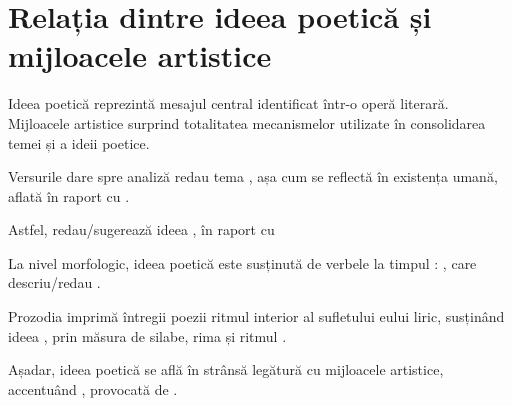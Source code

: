 \section{Relația dintre ideea poetică și mijloacele artistice}

Ideea poetică reprezintă mesajul central identificat într-o operă literară. Mijloacele artistice surprind totalitatea mecanismelor utilizate în consolidarea temei și a ideii poetice.

Versurile dare spre analiză redau tema , așa cum se reflectă în existența umană, aflată în raport cu .

Astfel,  redau/sugerează ideea , în raport cu 

La nivel morfologic, ideea poetică este susținută de verbele la timpul : , care descriu/redau .

Prozodia imprimă întregii poezii ritmul interior al sufletului eului liric, susținând ideea , prin măsura de  silabe, rima  și ritmul .

Așadar, ideea poetică se află în strânsă legătură cu mijloacele artistice, accentuând , provocată de .

